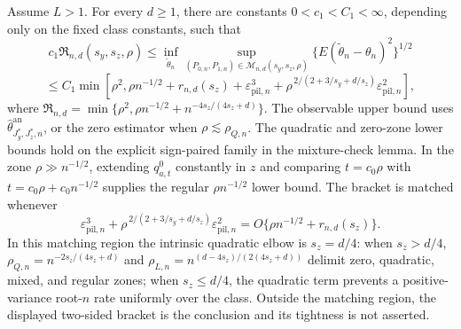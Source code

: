 Assume \(L>1\). For every \(d\ge1\), there are constants \(0<c_1<C_1<\infty\), depending only on the fixed class constants, such that
\[
c_1\mathfrak R_{n,d}(s_y,s_z,\rho)\le\inf_{\widetilde\theta_n}\sup_{(P_{0,n},P_{1,n})\in\mathcal M_{n,d}(s_y,s_z,\rho)}\{E(\widetilde\theta_n-\theta_n)^2\}^{1/2}
\]
\[
\le C_1\min\!\left[\rho^2,\rho n^{-1/2}+r_{n,d}(s_z)+\varepsilon_{\mathrm{pil},n}^3+\rho^{\,2/(2+3/s_y+d/s_z)}\varepsilon_{\mathrm{pil},n}^2\right],
\]
where \(\mathfrak R_{n,d}=\min\{\rho^2,\rho n^{-1/2}+n^{-4s_z/(4s_z+d)}\}\). The observable upper bound uses \(\widehat\theta^{\mathrm{an}}_{J_y^*,J_z^*,n}\), or the zero estimator when \(\rho\lesssim\rho_{Q,n}\). The quadratic and zero-zone lower bounds hold on the explicit sign-paired family in the mixture-check lemma. In the zone \(\rho\gg n^{-1/2}\), extending \(q_{a,t}^{0}\) constantly in \(z\) and comparing \(t=c_0\rho\) with \(t=c_0\rho+c_0n^{-1/2}\) supplies the regular \(\rho n^{-1/2}\) lower bound. The bracket is matched whenever
\[
\varepsilon_{\mathrm{pil},n}^3+\rho^{\,2/(2+3/s_y+d/s_z)}\varepsilon_{\mathrm{pil},n}^2
=O\{\rho n^{-1/2}+r_{n,d}(s_z)\}.
\]
In this matching region the intrinsic quadratic elbow is \(s_z=d/4\): when \(s_z>d/4\), \(\rho_{Q,n}=n^{-2s_z/(4s_z+d)}\) and \(\rho_{L,n}=n^{(d-4s_z)/(2(4s_z+d))}\) delimit zero, quadratic, mixed, and regular zones; when \(s_z\le d/4\), the quadratic term prevents a positive-variance root-\(n\) rate uniformly over the class. Outside the matching region, the displayed two-sided bracket is the conclusion and its tightness is not asserted.